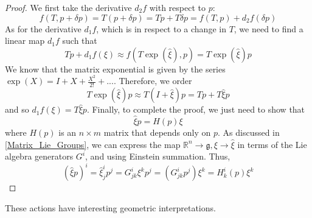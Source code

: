 \documentclass[reqno]{amsart}
\theoremstyle{definition}
\numberwithin{equation}{section}
\begin{document}
\begin{proof}
    We first take the derivative $d_2f$ with respect to $p$:
    \begin{equation*}
        f(T, p + \delta{p}) = T(p + \delta{p}) = Tp + T\delta{p} = f(T, p) + d_2f(\delta{p})
    \end{equation*}
    As for the derivative $d_1f$, which is in respect to a change in $T$, we need to find a linear map $d_1f$ such that
    \begin{equation*}
        Tp + d_1f(\xi) \approx f(T\exp(\hat\xi), p) = T\exp(\hat\xi)p
    \end{equation*}
    We know that the matrix exponential is given by the series $\exp(X) = I + X + \frac{X^2}{2!} + ...$. Therefore, we order
    \begin{equation*}
        T\exp(\hat\xi)p \approx T(I + \hat\xi)p = Tp + T\hat\xi{p}
    \end{equation*}
    and so $d_1f(\xi) = T\hat\xi p$. Finally, to complete the proof, we just need to show that
    \begin{equation*}
        \hat\xi p = H(p)\xi
    \end{equation*}
    where $H(p)$ is an $n \times m$ matrix that depends only on $p$. As discussed in \ref{Matrix_Lie_Groups}, we can express the map $\mathbb{R}^n \to \mathfrak{g}, \xi \to \hat\xi$ in terms of the Lie algebra generators $G^i$, and using Einstein summation. Thus,
    \begin{equation*}
        (\hat\xi p)^i = \hat\xi_j^ip^j = G^i_{jk}\xi^kp^j = (G^i_{jk}p^j)\xi^k = H^i_k(p)\xi^k
    \end{equation*}
\end{proof}

These actions have interesting geometric interpretations.
\end{document}
